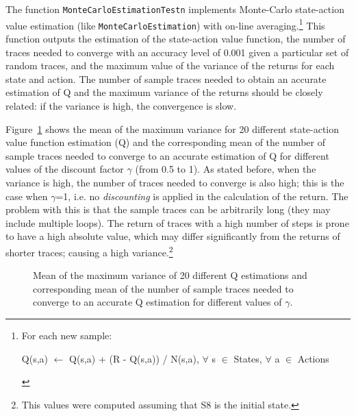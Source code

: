 \documentclass[11pt]{article}   	%
\begin{document}
The function \texttt{MonteCarloEstimationTestn} implements Monte-Carlo state-action value estimation (like \texttt{MonteCarloEstimation}) with on-line averaging.\footnote{ For each new sample: \begin{algorithmic}
  \STATE Q(s,a) $\leftarrow$ Q(s,a) + (R - Q(s,a)) / N(s,a), $\forall$ s $\in$ States, $\forall$ a $\in$ Actions\;
\end{algorithmic}} This function outputs the estimation of the state-action value function, the number of traces needed to converge with an accuracy level of 0.001 given a particular set of random traces, and the maximum value of the variance of the returns for each state and action. The number of sample traces needed to obtain an accurate estimation of Q and the maximum variance of the returns should be closely related: if the variance is high, the convergence is slow.

Figure~\ref{fig:maxvar} shows the mean of the maximum variance for 20 different state-action value function estimation (Q) and the corresponding mean of the number of sample traces needed to converge to an accurate estimation of Q for different values of the discount factor $\gamma$ (from 0.5 to 1). As stated before, when the variance is high, the number of traces needed to converge is also high; this is the case when $\gamma$=1, i.e. no \textit{discounting} is applied in the calculation of the return. The problem with this is that the sample traces can be arbitrarily long (they may include multiple loops). The return of traces with a high number of steps is prone to have a high absolute value, which may differ significantly from the returns of shorter traces; causing a high variance.\footnote{This values were computed assuming that S8 is the initial state.}

\begin{figure}
\centering
\setlength\fboxsep{0pt}
\setlength\fboxrule{0.6pt}
\caption{Mean of the maximum variance of 20 different Q estimations and corresponding mean of the number of sample traces needed to converge to an accurate Q estimation for different values of $\gamma$. \label{fig:maxvar}}
\end{figure}
\end{document}
